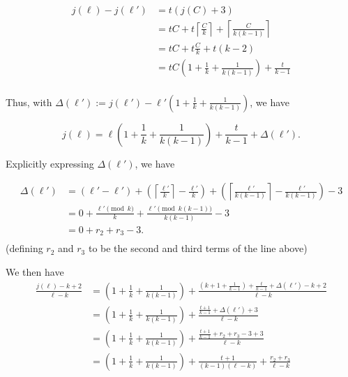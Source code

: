 \documentclass{article}
\newcommand{\edit}[1]{}%
\newcommand{\dc}[1]{}%
\newcommand{\zh}[1]{}%
\begin{document}
\begin{align*}
    j(\ell) -j(\ell')&= t(j(C)+3) \\
    &= tC + t\left\lceil\frac{C}{k}\right\rceil +\left\lceil\frac{C}{k(k-1)}\right\rceil  \\
    &= tC + t\frac{C}{k} + t(k-2)\\
    &= tC\left(1 + \frac{1}{k}+\frac{1}{k(k-1)}\right) +\frac{t}{k-1}\\
\end{align*}

Thus, with $\Delta(\ell') :=j(\ell')-\ell'\left(1 + \frac{1}{k}+\frac{1}{k(k-1)}\right) $, we have

\[j(\ell) = \ell\left(1 + \frac{1}{k}+\frac{1}{k(k-1)}\right) + \frac{t}{k-1} + \Delta(\ell').\]

Explicitly expressing $\Delta(\ell')$, we have

\begin{align*}
    \Delta(\ell') &= (\ell'-\ell')+\left(\left\lceil\frac{\ell'}{k}\right\rceil -\frac{\ell'}{k}\right)+ \left(\left\lceil\frac{\ell'}{k(k-1)}\right\rceil-\frac{\ell'}{k(k-1)}\right)-3\\
    &= 0 + \frac{\ell' \pmod{k}}{k} +\frac{\ell' \pmod{k(k-1)}}{k(k-1)} -3\\
    &= 0 + r_2 + r_3 -3.\\
\end{align*}(defining $r_2$ and $r_3$ to be the second and third terms of the line above)
\edit{kind of want to cut out the second line with the modulos, and just immediately give $r_2,r_3$}\dc{ do you define $r_2$ and $r_3$ before now? Also, you can cut the ``0+'' from the beginning of the last line, and I would recommend making your own mod command since spacing is weird on pmod} 

\vspace{.75em}

We then have
\begin{align*}
    \frac{j(\ell)-k+2}{\ell-k} &= \left(1 + \frac{1}{k}+\frac{1}{k(k-1)} \right) +\frac{\left(k+1+\frac{1}{k-1}\right) +\frac{t}{k-1} + \Delta(\ell') -k +2}{\ell-k}\\
    &= \left(1 + \frac{1}{k}+\frac{1}{k(k-1)} \right) +\frac{\frac{t+1}{k-1} + \Delta(\ell') +3}{\ell-k}\\
    &= \left(1 + \frac{1}{k}+\frac{1}{k(k-1)} \right) +\frac{\frac{t+1}{k-1} + r_2+r_3-3+3}{\ell-k}\\
    &= \left(1 + \frac{1}{k}+\frac{1}{k(k-1)} \right) +\frac{t+1}{(k-1)(\ell-k)} +\frac{ r_2+r_3}{\ell-k}\\
\end{align*}
\dc{again, don't need so many steps}\zh{ agreed, need to smoosh two steps into an intermediate one}
\end{document}
